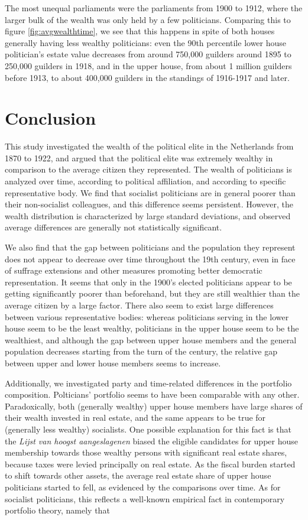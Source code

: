     The most unequal parliaments were the parliaments from 1900 to 1912, where the larger bulk of the wealth was only held by a few politicians. Comparing this to figure \ref{fig:avgwealthtime}, we see that this happens in spite of both houses generally having less wealthy politicians: even the 90th percentile lower house politician's estate value decreases from around 750,000 guilders around 1895 to 250,000 guilders in 1918, and in the upper house, from about 1 million guilders before 1913, to about 400,000 guilders in the standings of 1916-1917 and later. 
    

\section{Conclusion}

    This study investigated the wealth of the political elite in the Netherlands from 1870 to 1922, and argued that the political elite was extremely wealthy in comparison to the average citizen they represented. The wealth of politicians is analyzed over time, according to political affiliation, and according to specific representative body. We find that socialist politicians are in general poorer than their non-socialist colleagues, and this difference seems persistent. However, the wealth distribution is characterized by large standard deviations, and observed average differences are generally not statistically significant. 

    We also find that the gap between politicians and the population they represent does not appear to decrease over time throughout the 19th century, even in face of suffrage extensions and other measures promoting better democratic representation. It seems that only in the 1900's elected politicians appear to be getting significantly poorer than beforehand, but they are still wealthier than the average citizen by a large factor. There also seem to exist large differences between various representative bodies: whereas politicians serving in the lower house seem to be the least wealthy, politicians in the upper house seem to be the wealthiest, and although the gap between upper house members and the general population decreases starting from the turn of the century, the relative gap between upper and lower house members seems to increase. 

    Additionally, we investigated party and time-related differences in the portfolio composition. Polticians' portfolio seems to have been comparable with any other. Paradoxically, both (generally wealthy) upper house members have large shares of their wealth invested in real estate, and the same appears to be true for (generally less wealthy) socialists. One possible explanation for this fact is that the \textit{Lijst van hoogst aangeslagenen} biased the eligible candidates for upper house membership towards those wealthy persons with significant real estate shares, because taxes were levied principally on real estate. As the fiscal burden started to shift towards other assets, the average real estate share of upper house politicians started to fell, as evidenced by the comparisons over time. As for socialist politicians, this reflects a well-known empirical fact in contemporary portfolio theory, namely that 

